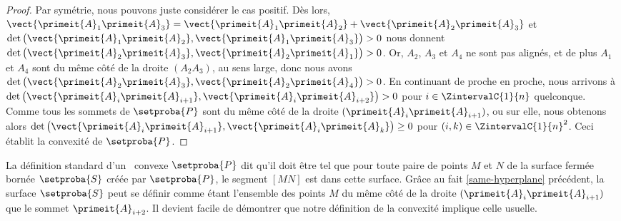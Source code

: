 \begin{proof}
    Par symétrie, nous pouvons juste considérer le cas positif.
    Dès lors,
    $\vect{\primeit{A}_1 \primeit{A}_3} = \vect{\primeit{A}_1 \primeit{A}_2} + \vect{\primeit{A}_2 \primeit{A}_3}$
    et
    $\det \big( \vect{\primeit{A}_1 \primeit{A}_2}, \vect{\primeit{A}_1 \primeit{A}_3} \big) > 0$
    nous donnent
    $\det \big( \vect{\primeit{A}_2 \primeit{A}_3}, \vect{\primeit{A}_2 \primeit{A}_1} \big) > 0$.
    Or, $A_2$, $A_3$ et $A_4$ ne sont pas alignés, et de plus $A_1$ et $A_4$ sont du même côté de la droite $(A_2 A_3)$, au sens large,
    donc nous avons
    $\det \big( \vect{\primeit{A}_2 \primeit{A}_3}, \vect{\primeit{A}_2 \primeit{A}_4} \big) > 0$.
    En continuant de proche en proche, nous arrivons à
    $\det \big( \vect{\primeit{A}_i \primeit{A}_{i+1}}, \vect{\primeit{A}_i \primeit{A}_{i+2}} \big) > 0$
    pour $i \in \ZintervalC{1}{n}$ quelconque.
    Comme tous les sommets de $\setproba{P}$ sont du même côté de la droite $( \primeit{A}_i \primeit{A}_{i+1} )$, ou sur elle,
    nous obtenons alors
    $\det \big( \vect{\primeit{A}_i \primeit{A}_{i+1}}, \vect{\primeit{A}_i \primeit{A}_k} \big) \geq 0$
    pour $(i, k) \in \ZintervalC{1}{n}^2$.
    Ceci établit la convexité de $\setproba{P}$.
\end{proof}




\begin{remark}
    La définition standard d'un \ngone\ convexe $\setproba{P}$ dit qu'il doit être tel que pour toute paire de points $M$ et $N$ de la surface fermée bornée $\setproba{S}$ créée par $\setproba{P}$, le segment $[MN]$ est dans cette surface.
    Grâce au fait \ref{same-hyperplane} précédent, la surface $\setproba{S}$ peut se définir comme étant l'ensemble des points $M$ du même côté de la droite $( \primeit{A}_i \primeit{A}_{i+1} )$ que le sommet $\primeit{A}_{i+2}$.
    Il devient facile de démontrer que notre définition de la convexité implique celle usuelle.
\end{remark}
